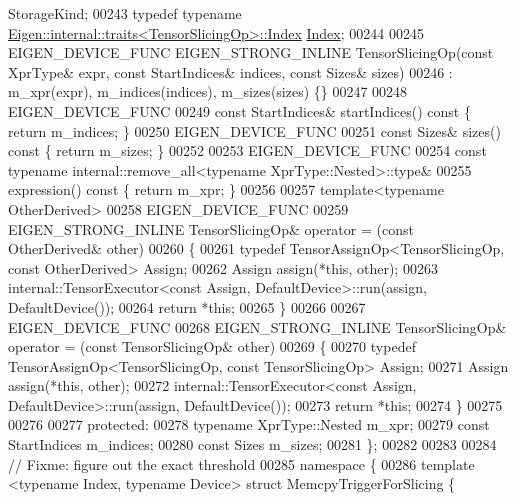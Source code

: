\begin{DoxyCode}
       StorageKind;
00243   \textcolor{keyword}{typedef} \textcolor{keyword}{typename} \hyperlink{struct_eigen_1_1internal_1_1traits}{Eigen::internal::traits<TensorSlicingOp>::Index}
       \hyperlink{namespace_eigen_a62e77e0933482dafde8fe197d9a2cfde}{Index};
00244 
00245   EIGEN\_DEVICE\_FUNC EIGEN\_STRONG\_INLINE TensorSlicingOp(\textcolor{keyword}{const} XprType& expr, \textcolor{keyword}{const} StartIndices& indices, \textcolor{keyword}{
      const} Sizes& sizes)
00246       : m\_xpr(expr), m\_indices(indices), m\_sizes(sizes) \{\}
00247 
00248     EIGEN\_DEVICE\_FUNC
00249     \textcolor{keyword}{const} StartIndices& startIndices()\textcolor{keyword}{ const }\{ \textcolor{keywordflow}{return} m\_indices; \}
00250     EIGEN\_DEVICE\_FUNC
00251     \textcolor{keyword}{const} Sizes& sizes()\textcolor{keyword}{ const }\{ \textcolor{keywordflow}{return} m\_sizes; \}
00252 
00253     EIGEN\_DEVICE\_FUNC
00254     \textcolor{keyword}{const} \textcolor{keyword}{typename} internal::remove\_all<typename XprType::Nested>::type&
00255     expression()\textcolor{keyword}{ const }\{ \textcolor{keywordflow}{return} m\_xpr; \}
00256 
00257     \textcolor{keyword}{template}<\textcolor{keyword}{typename} OtherDerived>
00258     EIGEN\_DEVICE\_FUNC
00259     EIGEN\_STRONG\_INLINE TensorSlicingOp& operator = (\textcolor{keyword}{const} OtherDerived& other)
00260     \{
00261       \textcolor{keyword}{typedef} TensorAssignOp<TensorSlicingOp, const OtherDerived> Assign;
00262       Assign assign(*\textcolor{keyword}{this}, other);
00263       internal::TensorExecutor<const Assign, DefaultDevice>::run(assign, DefaultDevice());
00264       \textcolor{keywordflow}{return} *\textcolor{keyword}{this};
00265     \}
00266 
00267     EIGEN\_DEVICE\_FUNC
00268     EIGEN\_STRONG\_INLINE TensorSlicingOp& operator = (\textcolor{keyword}{const} TensorSlicingOp& other)
00269     \{
00270       \textcolor{keyword}{typedef} TensorAssignOp<TensorSlicingOp, const TensorSlicingOp> Assign;
00271       Assign assign(*\textcolor{keyword}{this}, other);
00272       internal::TensorExecutor<const Assign, DefaultDevice>::run(assign, DefaultDevice());
00273       \textcolor{keywordflow}{return} *\textcolor{keyword}{this};
00274     \}
00275 
00276 
00277   \textcolor{keyword}{protected}:
00278     \textcolor{keyword}{typename} XprType::Nested m\_xpr;
00279     \textcolor{keyword}{const} StartIndices m\_indices;
00280     \textcolor{keyword}{const} Sizes m\_sizes;
00281 \};
00282 
00283 
00284 \textcolor{comment}{// Fixme: figure out the exact threshold}
00285 \textcolor{keyword}{namespace }\{
00286 \textcolor{keyword}{template} <\textcolor{keyword}{typename} Index, \textcolor{keyword}{typename} Device> \textcolor{keyword}{struct }MemcpyTriggerForSlicing \{

\end{DoxyCode}
